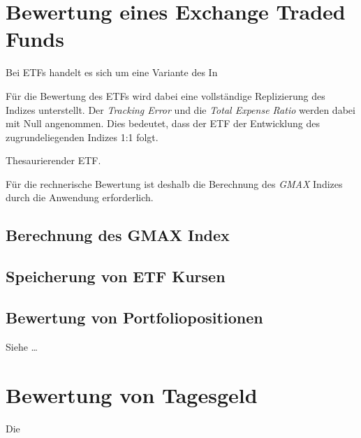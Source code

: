 \documentclass[12pt, a4paper]{article}
\begin{document}
\section{Bewertung eines Exchange Traded Funds}
\label{sec:bewertung_eines_exchange_traded_funds}

Bei ETFs handelt es sich um eine Variante des In



Für die Bewertung des ETFs wird dabei eine vollständige Replizierung des Indizes unterstellt.
Der \textit{Tracking Error} und die \textit{Total Expense Ratio} werden dabei mit Null angenommen.
Dies bedeutet, dass der ETF der Entwicklung des zugrundeliegenden Indizes 1:1 folgt.

Thesaurierender ETF.

Für die rechnerische Bewertung ist deshalb die Berechnung des \textit{GMAX} Indizes durch die Anwendung erforderlich.

\subsection{Berechnung des {GMAX} Index}

\subsection{Speicherung von {ETF} Kursen}

\subsection{Bewertung von Portfoliopositionen}
Siehe \dots



\section{Bewertung von Tagesgeld}
\label{sec:bewertung_von_festgeldern}

Die


\end{document}
